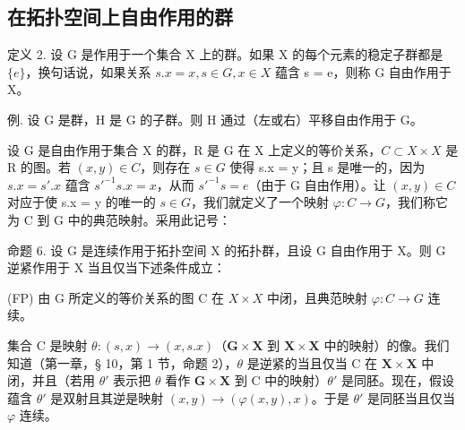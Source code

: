\subsection{在拓扑空间上自由作用的群}

定义 2. 设 G 是作用于一个集合 X 上的群。如果 X 的每个元素的稳定子群都是 \(\{e\}\)，换句话说，如果关系 \(s.x = x, s \in G, x \in X\) 蕴含 s = e，则称 G 自由作用于 X。

例. 设 G 是群，H 是 G 的子群。则 H 通过（左或右）平移自由作用于 G。

设 G 是自由作用于集合 X 的群，R 是 G 在 X 上定义的等价关系，\(C \subset X \times X\) 是 R 的图。若 \((x, y) \in C\)，则存在 \(s \in G\) 使得 s.x = y；且 s 是唯一的，因为 \(s.x = s'.x\) 蕴含 \(s'^{-1}s.x = x\)，从而 \(s'^{-1}s = e\)（由于 G 自由作用）。让 \((x, y) \in C\) 对应于使 s.x = y 的唯一的 \(s \in G\)，我们就定义了一个映射 \(\varphi: C \to G\)，我们称它为 C 到 G 中的典范映射。采用此记号：

命题 6. 设 G 是连续作用于拓扑空间 X 的拓扑群，且设 G 自由作用于 X。则 G 逆紧作用于 X 当且仅当下述条件成立：

(FP) 由 G 所定义的等价关系的图 C 在 \(X \times X\) 中闭，且典范映射 \(\varphi: C \rightarrow G\) 连续。

集合 C 是映射 \(\theta: (s, x) \to (x, s.x)\)（\(\mathbf{G} \times \mathbf{X}\) 到 \(\mathbf{X} \times \mathbf{X}\) 中的映射）的像。我们知道（第一章，§ 10，第 1 节，命题 2），\(\theta\) 是逆紧的当且仅当 C 在 \(\mathbf{X} \times \mathbf{X}\) 中闭，并且（若用 \(\theta'\) 表示把 \(\theta\) 看作 \(\mathbf{G} \times \mathbf{X}\) 到 C 中的映射）\(\theta'\) 是同胚。现在，假设蕴含 \(\theta'\) 是双射且其逆是映射 \((x, y) \to (\varphi(x, y), x)\)。于是 \(\theta'\) 是同胚当且仅当 \(\varphi\) 连续。

